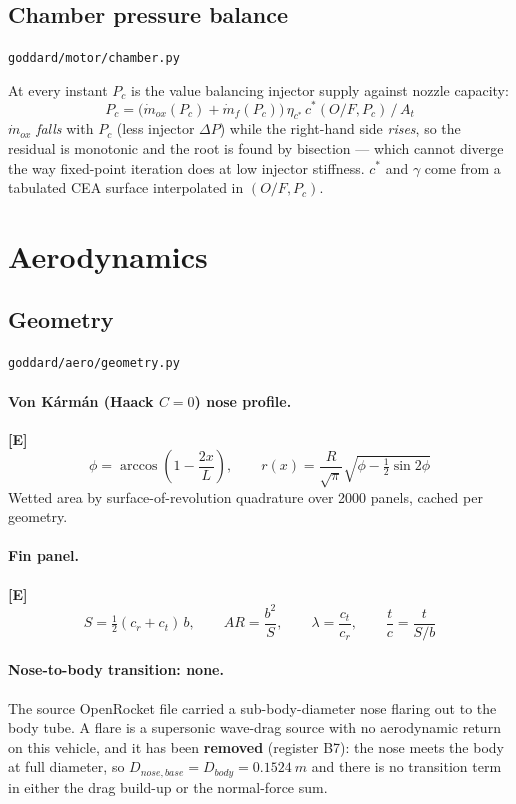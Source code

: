 \documentclass[11pt,a4paper]{article}
\newcommand{\established}{\textcolor{okgreen}{\textbf{[E]}}\xspace}
\newcommand{\src}[1]{\hfill{\footnotesize\texttt{#1}}}
\begin{document}
\subsection{Chamber pressure balance}
\src{goddard/motor/chamber.py}

At every instant $P_c$ is the value balancing injector supply against nozzle
capacity:
\begin{equation}
\boxed{\ P_c = \bigl(\dot m_{ox}(P_c) + \dot m_f(P_c)\bigr)\,
        \eta_{c^*}\, c^*(O\!/\!F, P_c) \,/\, A_t\ }
\end{equation}
$\dot m_{ox}$ \emph{falls} with $P_c$ (less injector $\Delta P$) while the
right-hand side \emph{rises}, so the residual is monotonic and the root is found
by bisection --- which cannot diverge the way fixed-point iteration does at low
injector stiffness. $c^*$ and $\gamma$ come from a tabulated CEA surface
interpolated in $(O\!/\!F, P_c)$.

\section{Aerodynamics}

\subsection{Geometry}
\src{goddard/aero/geometry.py}

\paragraph{Von K\'arm\'an (Haack $C=0$) nose profile.} \established
\begin{equation}
\phi = \arccos\!\left(1 - \frac{2x}{L}\right), \qquad
r(x) = \frac{R}{\sqrt{\pi}}\sqrt{\phi - \tfrac{1}{2}\sin 2\phi}
\end{equation}
Wetted area by surface-of-revolution quadrature over 2000 panels, cached per
geometry.

\paragraph{Fin panel.} \established
\begin{equation}
S = \tfrac{1}{2}(c_r + c_t)\,b, \qquad
AR = \frac{b^2}{S}, \qquad
\lambda = \frac{c_t}{c_r}, \qquad
\frac{t}{c} = \frac{t}{S/b}
\end{equation}

\paragraph{Nose-to-body transition: none.}
The source OpenRocket file carried a sub-body-diameter nose flaring out to the
body tube. A flare is a supersonic wave-drag source with no aerodynamic return
on this vehicle, and it has been \textbf{removed} (register B7): the nose meets
the body at full diameter, so $D_{nose,base} = D_{body} = \SI{0.1524}{m}$ and
there is no transition term in either the drag build-up or the normal-force
sum.
\end{document}
